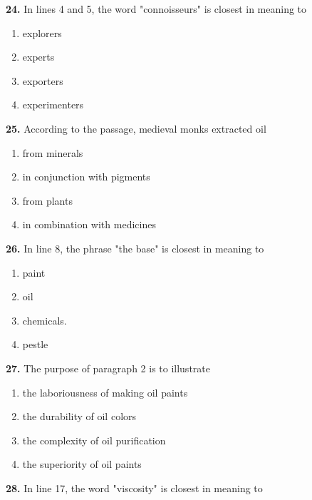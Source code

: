 \documentclass[12pt]{article}
\begin{document}
\par
\vspace{0.25\baselineskip}
\noindent\textbf{24.} In lines 4 and 5, the word "connoisseurs" is closest in meaning to
\begin{enumerate}[label=(\Alph*),leftmargin=*,itemsep=0.2em]
\item explorers
\item experts
\item exporters
\item experimenters
\end{enumerate}
\par
\vspace{0.25\baselineskip}
\noindent\textbf{25.} According to the passage, medieval monks extracted oil
\begin{enumerate}[label=(\Alph*),leftmargin=*,itemsep=0.2em]
\item from minerals
\item in conjunction with pigments
\item from plants
\item in combination with medicines
\end{enumerate}
\par
\vspace{0.25\baselineskip}
\noindent\textbf{26.} In line 8, the phrase "the base" is closest in meaning to
\begin{enumerate}[label=(\Alph*),leftmargin=*,itemsep=0.2em]
\item paint
\item oil
\item chemicals.
\item pestle
\end{enumerate}
\par
\vspace{0.25\baselineskip}
\noindent\textbf{27.} The purpose of paragraph 2 is to illustrate
\begin{enumerate}[label=(\Alph*),leftmargin=*,itemsep=0.2em]
\item the laboriousness of making oil paints
\item the durability of oil colors
\item the complexity of oil purification
\item the superiority of oil paints
\end{enumerate}
\par
\vspace{0.25\baselineskip}
\noindent\textbf{28.} In line 17, the word "viscosity" is closest in meaning to
\end{document}
